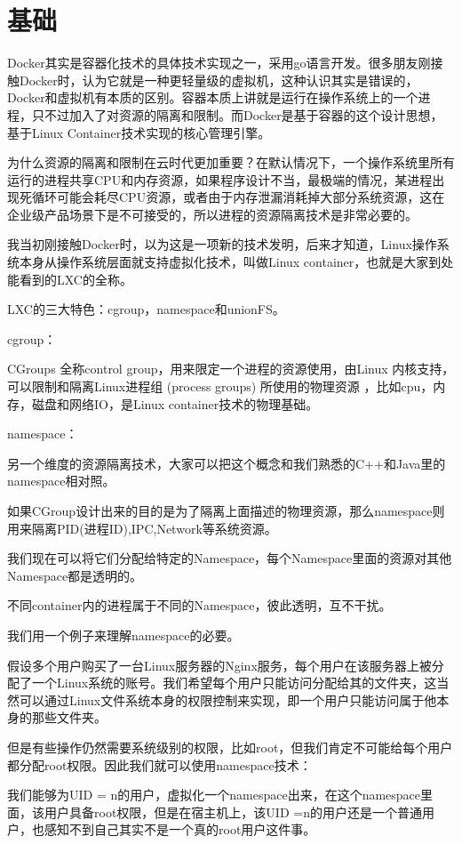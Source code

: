 \chapter{基础}
\newpage

Docker其实是容器化技术的具体技术实现之一，采用go语言开发。很多朋友刚接触Docker时，认为它就是一种更轻量级的虚拟机，这种认识其实是错误的，Docker和虚拟机有本质的区别。容器本质上讲就是运行在操作系统上的一个进程，只不过加入了对资源的隔离和限制。而Docker是基于容器的这个设计思想，基于Linux Container技术实现的核心管理引擎。

为什么资源的隔离和限制在云时代更加重要？在默认情况下，一个操作系统里所有运行的进程共享CPU和内存资源，如果程序设计不当，最极端的情况，某进程出现死循环可能会耗尽CPU资源，或者由于内存泄漏消耗掉大部分系统资源，这在企业级产品场景下是不可接受的，所以进程的资源隔离技术是非常必要的。

我当初刚接触Docker时，以为这是一项新的技术发明，后来才知道，Linux操作系统本身从操作系统层面就支持虚拟化技术，叫做Linux container，也就是大家到处能看到的LXC的全称。

LXC的三大特色：cgroup，namespace和unionFS。

cgroup：

CGroups 全称control group，用来限定一个进程的资源使用，由Linux 内核支持，可以限制和隔离Linux进程组 (process groups) 所使用的物理资源 ，比如cpu，内存，磁盘和网络IO，是Linux container技术的物理基础。

namespace：

另一个维度的资源隔离技术，大家可以把这个概念和我们熟悉的C++和Java里的namespace相对照。

如果CGroup设计出来的目的是为了隔离上面描述的物理资源，那么namespace则用来隔离PID(进程ID),IPC,Network等系统资源。

我们现在可以将它们分配给特定的Namespace，每个Namespace里面的资源对其他Namespace都是透明的。

不同container内的进程属于不同的Namespace，彼此透明，互不干扰。

我们用一个例子来理解namespace的必要。

假设多个用户购买了一台Linux服务器的Nginx服务，每个用户在该服务器上被分配了一个Linux系统的账号。我们希望每个用户只能访问分配给其的文件夹，这当然可以通过Linux文件系统本身的权限控制来实现，即一个用户只能访问属于他本身的那些文件夹。

但是有些操作仍然需要系统级别的权限，比如root，但我们肯定不可能给每个用户都分配root权限。因此我们就可以使用namespace技术：

我们能够为UID = n的用户，虚拟化一个namespace出来，在这个namespace里面，该用户具备root权限，但是在宿主机上，该UID =n的用户还是一个普通用户，也感知不到自己其实不是一个真的root用户这件事。

